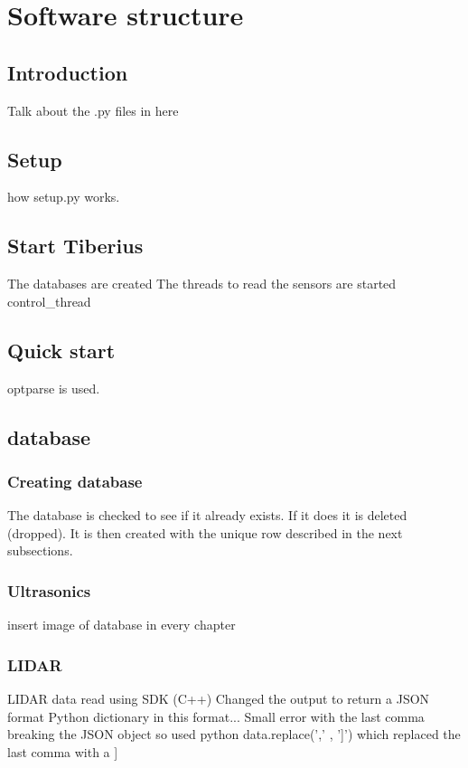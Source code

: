 \section{Software structure}
\pagestyle{aidan}

\subsection{Introduction}
Talk about the .py files in here

\subsection{Setup}
how setup.py works.

\subsection{Start Tiberius}
The databases are created
The threads to read the sensors are started
control_thread

\subsection{Quick start}
optparse is used.

\subsection{database}

\subsubsection{Creating database}
The database is checked to see if it already exists. If it does it is deleted (dropped). It is then created with the unique row described in the next subsections.

\subsubsection{Ultrasonics}
insert image of database in every chapter


\subsubsection{LIDAR}
\gls{LIDAR} data read using SDK (C++)
Changed the output to return a JSON format
Python dictionary in this format...
Small error with the last comma breaking the JSON object so used python data.replace(',\n' , ']') which replaced the last comma with a ]

